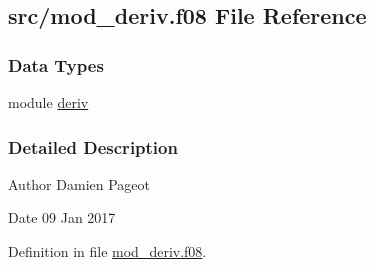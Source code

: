 \hypertarget{mod__deriv_8f08}{\subsection{src/mod\-\_\-deriv.f08 File Reference}
\label{mod__deriv_8f08}
}
\subsubsection*{Data Types}
\begin{DoxyCompactItemize}
\item 
module \hyperlink{classderiv}{deriv}
\end{DoxyCompactItemize}


\subsubsection{Detailed Description}
\begin{DoxyAuthor}{Author}
Damien Pageot 
\end{DoxyAuthor}
\begin{DoxyDate}{Date}
09 Jan 2017 
\end{DoxyDate}


Definition in file \hyperlink{mod__deriv_8f08_source}{mod\-\_\-deriv.\-f08}.

